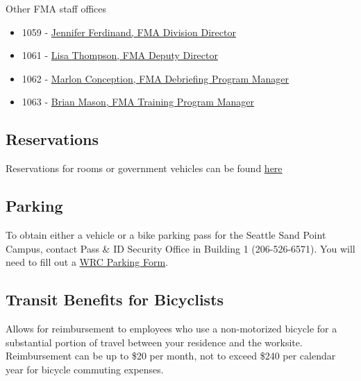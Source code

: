 \documentclass[
  letterpaper,
  DIV=11,
  numbers=noendperiod]{scrreprt}
\providecommand{\tightlist}{%
  \setlength{\itemsep}{0pt}\setlength{\parskip}{0pt}}\usepackage{longtable,booktabs,array}
\begin{document}
Other FMA staff offices

\begin{itemize}
\tightlist
\item
  1059 -
  \href{https://www.fisheries.noaa.gov/contact/jennifer-ferdinand}{Jennifer
  Ferdinand, FMA Division Director}
\item
  1061 -
  \href{https://www.fisheries.noaa.gov/contact/lisa-thompson}{Lisa
  Thompson, FMA Deputy Director}
\item
  1062 -
  \href{https://www.fisheries.noaa.gov/contact/marlon-concepcion}{Marlon
  Conception, FMA Debriefing Program Manager}
\item
  1063 - \href{https://www.fisheries.noaa.gov/contact/brian-mason}{Brian
  Mason, FMA Training Program Manager}
\end{itemize}

\hypertarget{reservations}{%
\subsection{Reservations}\label{reservations}}

Reservations for rooms or government vehicles can be found
\href{https://sites.google.com/noaa.gov/myafsc/reservations}{here}

\hypertarget{parking}{%
\subsection{Parking}\label{parking}}

To obtain either a vehicle or a bike parking pass for the Seattle Sand
Point Campus, contact Pass \& ID Security Office in Building 1
(206-526-6571). You will need to fill out a
\href{http://www.google.com/url?q=http\%3A\%2F\%2Fwww.wrc.noaa.gov\%2Fforms\%2FWRC\%2520Parking\%2520Decal\%2520v2008a.pdf\&sa=D\&sntz=1\&usg=AOvVaw2YdnFqmKoV029T-pt6UwFj}{WRC
Parking Form}.

\hypertarget{transit-benefits-for-bicyclists}{%
\subsection{Transit Benefits for
Bicyclists}\label{transit-benefits-for-bicyclists}}

Allows for reimbursement to employees who use a non-motorized bicycle
for a substantial portion of travel between your residence and the
worksite. Reimbursement can be up to \$20 per month, not to exceed \$240
per calendar year for bicycle commuting expenses.
\end{document}
